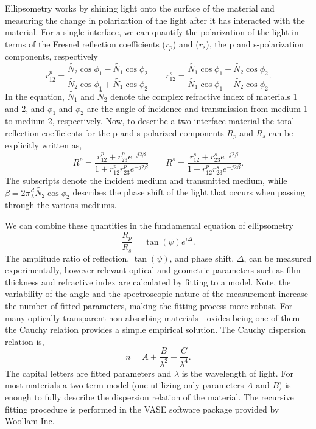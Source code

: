Ellipsometry works by shining light onto the surface of the material and measuring the change in polarization of the light after it has interacted with the material. For a single interface, we can quantify the polarization of the light in terms of the Fresnel reflection coefficients ($r_{p}$) and ($r_{s}$), the p and s-polarization components, respectively
\begin{equation}
r^{p}_{12} = \frac{\tilde{N_{2}}\cos{\phi_{1}} - \tilde{N_{1}}\cos{\phi_{2}}}{\tilde{N_{2}}\cos{\phi_{1}} + \tilde{N_{1}}\cos{\phi_{2}}}
\qquad
r^{s}_{12} = \frac{\tilde{N_{1}}\cos{\phi_{1}} - \tilde{N_{2}}\cos{\phi_{2}}}{\tilde{N_{1}}\cos{\phi_{1}} + \tilde{N_{2}}\cos{\phi_{2}}}.
\label{eq:fres}
\end{equation}
In the equation, $\tilde{N_{1}}$ and $\tilde{N_{2}}$ denote the complex refractive index of materials 1 and 2, and $\phi_{1}$ and $\phi_{2}$ are the angle of incidence and transmission from medium 1 to medium 2, respectively. Now, to describe a two interface material the total reflection coefficients for the p and s-polarized components $R_{p}$ and $R_{s}$ can be explicitly written as, 
\begin{equation}
R^{p} = \frac{r^{p}_{12}+r^{p}_{23}e^{-j2\beta}}{1+r^{p}_{12}r^{p}_{23}e^{-j2\beta}}
\qquad
R^{s} = \frac{r^{s}_{12}+r^{s}_{23}e^{-j2\beta}}{1+r^{p}_{12}r^{s}_{23}e^{-j2\beta}}.
\label{eq:refcof}
\end{equation}
The subscripts denote the incident medium and transmitted medium, while $\beta = 2\pi \frac{d}{\lambda}\tilde{N_{2}} \cos{\phi_{2}}$ describes the phase shift of the light that occurs when passing through the various mediums. 

We can combine these quantities in the fundamental equation of ellipsometry
\begin{equation}
\frac{R_{p}}{R_{s}} = \tan{(\psi)}e^{i\Delta}.
\label{ref:ellipsometry}
\end{equation}
The amplitude ratio of reflection, $\tan{(\psi)}$,  and phase shift, $\Delta$, can be measured experimentally, however relevant optical and geometric parameters such as film thickness and refractive index are calculated by fitting to a model. Note, the variability of the angle and the spectroscopic nature of the measurement increase the number of fitted parameters, making the fitting process  more robust. For many optically transparent non-absorbing materials---oxides being one of them---the Cauchy relation provides a simple empirical solution. The Cauchy dispersion relation is,
\begin{equation}
n = A + \frac{B}{\lambda^{2}} + \frac{C}{\lambda^{4}}.
\label{eq:cauchy}
\end{equation}
The capital letters are fitted parameters and $\lambda$ is the wavelength of light. For most materials a two term model (one utilizing only parameters $A$ and $B$) is enough to fully describe the dispersion relation of the material. The recursive fitting procedure is performed in the VASE software package provided by Woollam Inc.  


